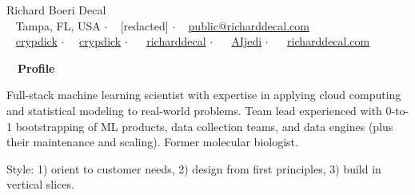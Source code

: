 \documentclass[a4paper,12pt]{article}
\newcommand{\resheading}[1]{{\hspace{-9pt} \colorbox{mygrey}{\begin{minipage}{\textwidth}{\textmd{~~\large \textbf{#1} \vphantom{p\^{E}}}}\end{minipage}}\vspace{6pt}} }
\begin{document}
    \begin{center}
    {\Huge Richard Boeri Decal}
        \\
        {\small \faMapMarker~ Tampa, FL, USA $\cdot$ \faPhone~ [redacted] $\cdot$ \faEnvelope~ \href{mailto:public@richarddecal.com}{public@richarddecal.com}  \\ \faGithubAlt~ \href{https://github.com/crypdick}{crypdick} $\cdot$~\faStackOverflow~  \href{https://stackoverflow.com/users/4212158/crypdick}{crypdick} $\cdot$ ~\faLinkedin~ \href{https://www.linkedin.com/in/richarddecal/}{richarddecal}  $\cdot$ ~\faTwitter~ \href{https://twitter.com/AIjedi}{AIjedi}  $\cdot$ ~\faHome~  \href{https://www.richarddecal.com}{richarddecal.com}}
    \end{center}

    \resheading{Profile}

    Full-stack machine learning scientist with expertise in applying cloud computing and statistical modeling to real-world problems.
    Team lead experienced with 0-to-1 bootstrapping of ML products, data collection teams, and data engines (plus their
     maintenance and scaling).
    Former molecular biologist.

    \vspace{0.5em} %

    Style: 1) orient to customer needs, 2) design from first principles, 3) build in vertical slices.\\


%
\end{document}

